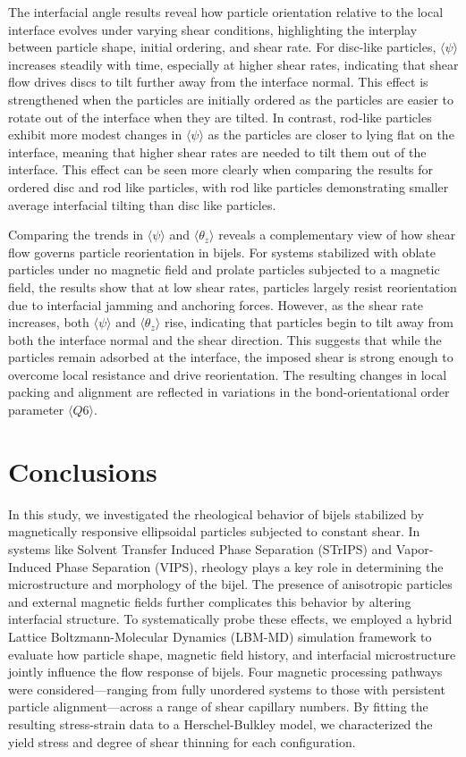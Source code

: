 The interfacial angle results reveal how particle orientation relative to the local interface evolves under varying shear conditions, highlighting the interplay between particle shape, 
initial ordering, and shear rate. For disc-like particles, $\langle \psi \rangle$ increases steadily with time, especially at higher shear rates, indicating that shear 
flow drives discs to tilt further away from the interface normal. This effect is strengthened when the particles are initially ordered as the particles are easier to rotate out of the
interface when they are tilted. In contrast, rod-like particles exhibit more modest changes in $\langle \psi \rangle$ as the particles are closer to lying flat on the interface, meaning
that higher shear rates are needed to tilt them out of the interface. This effect can be seen more clearly when comparing the results for ordered disc and rod like particles, with
rod like particles demonstrating smaller average interfacial tilting than disc like particles.  

Comparing the trends in $\langle \psi \rangle$ and $\langle \theta_z \rangle$ reveals a complementary view of how shear flow governs particle reorientation in bijels. For systems 
stabilized with oblate particles under no magnetic field and prolate particles subjected to a magnetic field, the results show that at low shear rates, particles largely resist 
reorientation due to interfacial jamming and anchoring forces. However, as the shear rate increases, both $\langle \psi \rangle$ and $\langle \theta_z \rangle$ rise, indicating that 
particles begin to tilt away from both the interface normal and the shear direction. This suggests that while the particles remain adsorbed at the interface, the imposed shear is strong 
enough to overcome local resistance and drive reorientation. The resulting changes in local packing and alignment are reflected in variations in the bond-orientational order parameter 
$\langle Q6 \rangle$.

\section{Conclusions}

In this study, we investigated the rheological behavior of bijels stabilized by magnetically responsive ellipsoidal particles subjected to constant shear. 
In systems like Solvent Transfer Induced Phase Separation (STrIPS) and Vapor-Induced Phase Separation (VIPS), rheology plays a key role in determining the
microstructure and morphology of the bijel. The presence of anisotropic particles and external magnetic fields further complicates this behavior 
by altering interfacial structure. To systematically probe these effects, we employed a hybrid Lattice Boltzmann-Molecular Dynamics (LBM-MD) simulation 
framework to evaluate how particle shape, magnetic field history, and interfacial microstructure jointly influence the flow response of bijels. 
Four magnetic processing pathways were considered—ranging from fully unordered systems to those with persistent particle alignment—across a range of 
shear capillary numbers. By fitting the resulting stress-strain data to a Herschel-Bulkley model, we characterized the yield stress and degree of shear 
thinning for each configuration.

